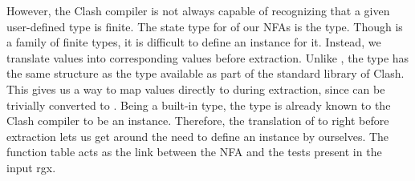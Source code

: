 However, the Clash compiler is not always capable of recognizing that
a given user-defined type is finite.
%
%
%
The state type for of our \glspl{NFA} is the  type.
%
Though  is a family of finite types, it is difficult to
define an  instance for it.
Instead, we translate  values into corresponding
 values before extraction.
%
Unlike , the  type has the same structure as
the  type available as part of the standard library of
Clash.
This gives us a way to map  values directly to 
during extraction, since  can be trivially converted to
.
Being a built-in type, the  type is already known to the
Clash compiler to be an  instance.
Therefore, the translation of  to  right
before extraction lets us get around the need to define an
 instance by ourselves.
The function table acts as the link between the \gls{NFA} and the
tests present in the input \gls{rgx}.

